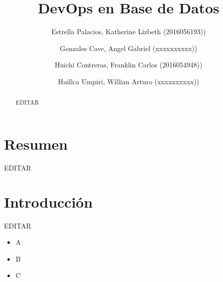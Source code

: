 \documentclass[preprint,12pt]{elsarticle}
\begin{document}
	
	\begin{frontmatter}

		\title{\huge DevOps en Base de Datos}
		
		\author{Estrella Palacios, Katherine Lizbeth              	(2016056193))}
		\author{Gonzales Cave, Angel Gabriel              	(xxxxxxxxxx))} %
		\author{Huichi Contreras, Franklin Carlos         	(2016054948))} %
		\author{Huillca Umpiri, Willian Arturo             		(xxxxxxxxxx))} %
		\address{Tacna, Perú}
		

		\begin{abstract}
		
EDITAR

		\end{abstract}


	\end{frontmatter}


	\section{Resumen}

EDITAR




\section{Introducción} 

EDITAR

\begin{itemize}
\item A
\item B
\item C


\end{itemize}
\end{document}
